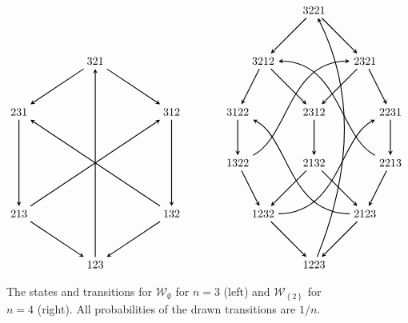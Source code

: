 \documentclass[reqno]{amsart}
\newcommand{\0}{\phantom{c}}
\newcommand{\mcW}{\mathcal{W}}
\newcommand{\set}[1]{\left\{ #1 \right\}}
\theoremstyle{plain}
\theoremstyle{definition}
\numberwithin{equation}{section}
\begin{document}
\begin{figure}
\[
\begin{tikzpicture}[>=stealth,thick,scale=0.8]
\node (321) at (3,8) {$321$};
\node (231) at (0,6) {$231$};
\node (312) at (6,6) {$312$};
\node (213) at (0,2) {$213$};
\node (132) at (6,2) {$132$};
\node (123) at (3,0) {$123$};
\draw[->] (123) -- (321); %
\draw[->] (132) -- (123); %
\draw[->] (132) -- (231); %
\draw[->] (213) -- (123); %
\draw[->] (213) -- (312); %
\draw[->] (231) -- (213); %
\draw[->] (312) -- (132); %
\draw[->] (321) -- (231); %
\draw[->] (321) -- (312); %
\end{tikzpicture}
\hspace{35pt}
\begin{tikzpicture}[>=stealth,thick,scale=0.8]
\node (1223) at (0,-2) {$1223$};
\node (3221) at (0,8) {$3221$};
\node (2321) at (2,6) {$2321$};
\node (3212) at (-2,6) {$3212$};
\node (2231) at (3,4) {$2231$};
\node (2312) at (0,4) {$2312$};
\node (3122) at (-3,4) {$3122$};
\node (2213) at (3,2) {$2213$};
\node (2132) at (0,2) {$2132$};
\node (1322) at (-3,2) {$1322$};
\node (1232) at (-2,0) {$1232$};
\node (2123) at (2,0) {$2123$};
\draw[->] (1223) .. controls (2,3) and (1,6) .. (3221);
\draw[->] (3221) -- (3212);
\draw[->] (3221) -- (2321);
\draw[->] (2321) -- (2231);
\draw[->] (2321) -- (2312);
\draw[->] (3212) -- (3122);
\draw[->] (3212) -- (2312);
\draw[->] (3122) -- (1322);
\draw[->] (2312) -- (2132);
\draw[->] (2231) -- (2213);
\draw[->] (1322) -- (1232);
\draw[->] (1322)  .. controls (-1,3) and (-1,6) .. (2321);
\draw[->] (2132) -- (2123);
\draw[->] (2132) -- (1232);
\draw[->] (2213) .. controls (1,3) and (1,6) .. (3212);
\draw[->] (2213) -- (2123);
\draw[->] (1232) -- (1223);
\draw[->] (1232) .. controls (1,0) and (1,3) .. (2231);
\draw[->] (2123) -- (1223);
\draw[->] (2123) .. controls (-1,0) and (-1,3) .. (3122);
\end{tikzpicture}
\]
\caption{The states and transitions for $\mcW_{\emptyset}$ for $n =3$ (left) and $\mcW_{\set{2}}$ for $n = 4$ (right).
All probabilities of the drawn transitions are $1/n$.}
\end{figure}
\end{document}
